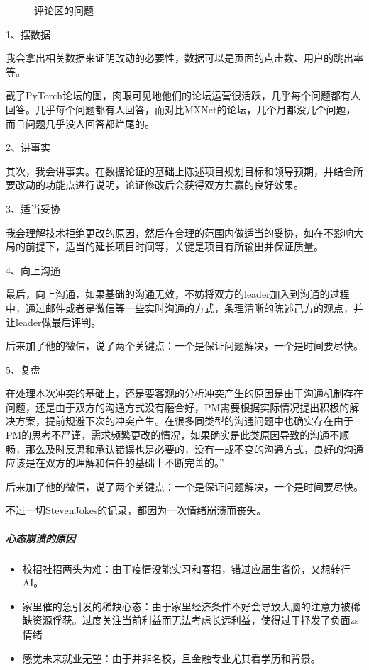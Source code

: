 \documentclass[letterpaper,10pt,english]{sphinxmanual}
\begin{document}
\begin{figure}[H]
\centering
\capstart

\noindent{}
\caption{评论区的问题}\label{\detokenize{chapter_interview/simulate_interview:id14}}\end{figure}

1、摆数据

我会拿出相关数据来证明改动的必要性，数据可以是页面的点击数、用户的跳出率等。

截了PyTorch论坛的图，肉眼可见地他们的论坛运营很活跃，几乎每个问题都有人回答。几乎每个问题都有人回答，而对比MXNet的论坛，几个月都没几个问题，而且问题几乎没人回答都烂尾的。

2、讲事实

其次，我会讲事实。在数据论证的基础上陈述项目规划目标和领导预期，并结合所要改动的功能点进行说明，论证修改后会获得双方共赢的良好效果。

3、适当妥协

我会理解技术拒绝更改的原因，然后在合理的范围内做适当的妥协，如在不影响大局的前提下，适当的延长项目时间等，关键是项目有所输出并保证质量。

4、向上沟通

最后，向上沟通，如果基础的沟通无效，不妨将双方的leader加入到沟通的过程中，通过邮件或者是微信等一些实时沟通的方式，条理清晰的陈述己方的观点，并让leader做最后评判。

后来加了他的微信，说了两个关键点：一个是保证问题解决，一个是时间要尽快。

5、复盘

在处理本次冲突的基础上，还是要客观的分析冲突产生的原因是由于沟通机制存在问题，还是由于双方的沟通方式没有磨合好，PM需要根据实际情况提出积极的解决方案，提前规避下次的冲突产生。在很多同类型的沟通问题中也确实存在由于PM的思考不严谨，需求频繁更改的情况，如果确实是此类原因导致的沟通不顺畅，那么及时反思和承认错误也是必要的，没有一成不变的沟通方式，良好的沟通应该是在双方的理解和信任的基础上不断完善的。”

后来加了他的微信，说了两个关键点：一个是保证问题解决，一个是时间要尽快。

不过一切StevenJokes的记录，都因为一次情绪崩溃而丧失。


\subparagraph{心态崩溃的原因}
\label{\detokenize{chapter_interview/simulate_interview:id6}}\begin{itemize}
\item {} 
校招社招两头为难：由于疫情没能实习和春招，错过应届生省份，又想转行AI。

\item {} 
家里催的急引发的稀缺心态：由于家里经济条件不好会导致大脑的注意力被稀缺资源俘获。过度关注当前利益而无法考虑长远利益，使得过于抒发了负面zs情绪%
\begin{footnote}[878]\sphinxAtStartFootnote
{}
%
\end{footnote}

\item {} 
感觉未来就业无望：由于并非名校，且金融专业尤其看学历和背景。

\end{itemize}
\end{document}

